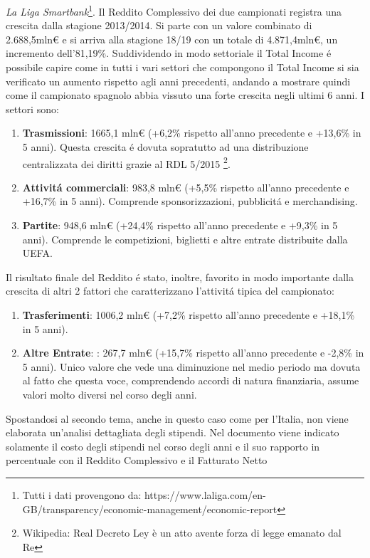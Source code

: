 \documentclass[
    corpo=12pt,
    oneside,
    evenboxes,
    tipotesi=triennale,
    stile=classica,
    oldstyle,
    autoretitolo,
    greek,
]{toptesi}
\begin{document}
\begin{interlinea}{1.5}
\emph{La Liga Smartbank}\footnote{Tutti i dati provengono da: https://www.laliga.com/en-GB/transparency/economic-management/economic-report}.
Il Reddito Complessivo dei due campionati registra una crescita 
dalla stagione 2013/2014. Si parte con un valore combinato di 2.688,5mln€ e si arriva alla stagione 18/19 con un totale di 4.871,4mln€, 
un incremento dell'81,19\%. 
Suddividendo in modo settoriale il Total Income \'e possibile capire come in tutti i vari settori che compongono il Total Income 
si sia verificato un aumento rispetto agli anni precedenti, andando a mostrare quindi come il campionato spagnolo abbia vissuto una forte crescita negli ultimi 6 anni.
I settori sono:
\begin{enumerate}
    \item \textbf{Trasmissioni}: 1665,1 mln€ (+6,2\% rispetto all'anno precedente e +13,6\% in 5 anni). Questa crescita \'e dovuta sopratutto ad una distribuzione 
    centralizzata dei diritti grazie al RDL 5/2015 \footnote{Wikipedia: Real Decreto Ley è un atto avente forza di legge emanato dal Re}.
    \item \textbf{Attivit\'a commerciali}: 983,8 mln€ (+5,5\% rispetto all'anno precedente e +16,7\% in 5 anni). Comprende sponsorizzazioni,
    pubblicit\'a e merchandising.
    \item \textbf{Partite}: 948,6 mln€ (+24,4\% rispetto all'anno precedente e +9,3\% in 5 anni). Comprende le competizioni, biglietti 
    e altre entrate distribuite dalla UEFA.
\end{enumerate}
Il risultato finale del Reddito \'e stato, inoltre, favorito in modo importante dalla crescita di altri 2 fattori che caratterizzano l'attivit\'a tipica del
campionato:
\begin{enumerate}
    \item \textbf{Trasferimenti}: 1006,2 mln€ (+7,2\% rispetto all'anno precedente e +18,1\% in 5 anni).
    \item \textbf{Altre Entrate}: : 267,7 mln€ (+15,7\% rispetto all'anno precedente e -2,8\% in 5 anni). Unico valore che vede una diminuzione
    nel medio periodo ma dovuta al fatto che questa voce, comprendendo accordi di natura finanziaria, assume valori molto diversi nel corso degli anni.
\end{enumerate}
Spostandosi al secondo tema, anche in questo caso come per l'Italia, non viene elaborata un'analisi dettagliata degli stipendi. Nel documento
viene indicato \linebreak solamente il costo degli stipendi nel corso degli anni e il suo rapporto in percentuale con il Reddito Complessivo e il Fatturato Netto

\end{interlinea}
\end{document}
